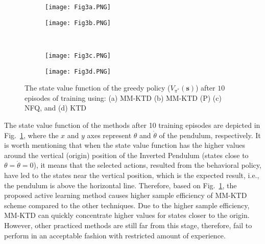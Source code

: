 \documentclass{ieeeaccess}
\def\MMK{\text{MM-KTD}}
\def\s{\bm{s}}
\begin{document}
\begin{figure}[t!]
  \begin{subfigure}{4cm}
    \centering
    \texttt{[image: Fig3a.PNG]}
    \caption{}
  \end{subfigure}
  \begin{subfigure}{4cm}
    \centering
    \texttt{[image: Fig3b.PNG]}
    \caption{}
  \end{subfigure}
 \\
  \begin{subfigure}{4cm}
    \centering
    \texttt{[image: Fig3c.PNG]}
    \caption{}
  \end{subfigure}
  \begin{subfigure}{4cm}
    \centering
    \texttt{[image: Fig3d.PNG]}
    \caption{}
  \end{subfigure}
\caption{\small The state value function of the greedy policy ($V_{\pi^*}(\s)$) after $10$ episodes of training using: (a) $\MMK$  (b) $\MMK$ (P) (c) NFQ, and (d) KTD}\label{Fig:3}
\end{figure}

The state value function of the methods after 10 training episodes are depicted in Fig.~\ref{Fig:3}, where the $x$ and $y$ axes represent $\theta$ and $\dot{\theta}$ of the pendulum, respectively. 
It is worth mentioning that when the state value function has the higher values around the vertical (origin) position of the Inverted Pendulum (states close to $\theta=\dot{\theta}=0$), it means that the selected actions, resulted from the behavioral policy, have led to the states near the vertical position, which is the expected result, i.e., the pendulum is above the horizontal line. Therefore, based on Fig.~\ref{Fig:3}, the proposed active learning method causes higher sample efficiency of $\MMK$ scheme compared to the other techniques. 
Due to the higher sample efficiency, $\MMK$ can quickly concentrate higher values for states closer to the origin. However, other practiced methods are still far from this stage, therefore, fail to perform in an acceptable fashion with restricted amount of experience.
\end{document}
